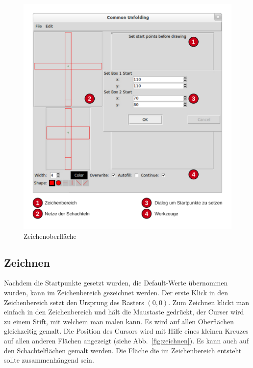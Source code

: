 \begin{figure}[htbp]
  \centering
  \includegraphics[scale=0.5]{03_pics/Zeichenbereich.pdf}
  \caption{Zeichenoberfläche}
  \label{fig:zeichenoberflaeche}
\end{figure}

\subsection{Zeichnen}
\label{subsec:zeichnen}

Nachdem die Startpunkte gesetzt wurden, \bzw die Default-Werte übernommen wurden, kann im Zeichenbereich gezeichnet werden. Der erste Klick in den Zeichenbereich setzt den Ursprung des Rasters $(0,0)$. Zum Zeichnen klickt man einfach in den Zeichenbereich und hält die Maustaste gedrückt, der Curser wird zu einem Stift, mit welchem man malen kann. Es wird auf allen Oberflächen gleichzeitig gemalt. Die Position des Cursors wird mit Hilfe eines kleinen Kreuzes auf allen anderen Flächen angezeigt (siehe Abb.~\ref{fig:zeichnen}). Es kann auch auf den Schachtelflächen gemalt werden. Die Fläche die im Zeichenbereich entsteht sollte zusammenhängend sein.

